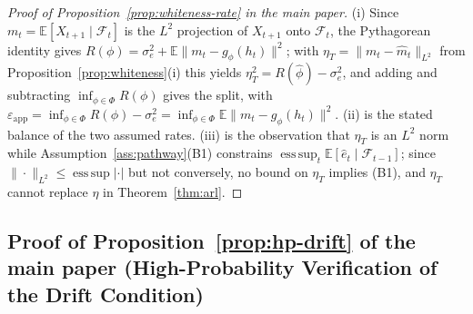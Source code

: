 \documentclass[bj,authoryear]{imsart}
\theoremstyle{plain}
\theoremstyle{definition}
\newcommand{\E}{\mathbb{E}}
\newcommand{\F}{\mathcal{F}}
\begin{document}
\begin{proof}[Proof of Proposition~\ref{prop:whiteness-rate} in the main paper]
  (i) Since $m_t=\E[X_{t+1}\mid\F_t]$ is the $L^2$ projection of $X_{t+1}$
  onto $\F_t$, the Pythagorean identity gives
  $R(\phi)=\sigma_e^2+\E\|m_t-g_\phi(h_t)\|^2$; with
  $\eta_T=\|m_t-\hat m_t\|_{L^2}$ from Proposition~\ref{prop:whiteness}(i) this
  yields $\eta_T^2=R(\hat\phi)-\sigma_e^2$, and adding and subtracting
  $\inf_{\phi\in\Phi}R(\phi)$ gives the split, with
  $\varepsilon_{\mathrm{app}}=\inf_{\phi\in\Phi}R(\phi)-\sigma_e^2
   =\inf_{\phi\in\Phi}\E\|m_t-g_\phi(h_t)\|^2$.
  (ii) is the stated balance of the two assumed rates.  (iii) is the
  observation that $\eta_T$ is an $L^2$ norm while
  Assumption~\ref{ass:pathway}(B1) constrains
  $\operatorname*{ess\,sup}_t\E[\hat e_t\mid\F_{t-1}]$; since
  $\|\cdot\|_{L^2}\leq\operatorname*{ess\,sup}|\cdot|$ but not conversely, no
  bound on $\eta_T$ implies (B1), and $\eta_T$ cannot replace $\eta$ in
  Theorem~\ref{thm:arl}.
\end{proof}

\subsection{Proof of Proposition~\ref{prop:hp-drift} of the main paper (High-Probability Verification of the Drift Condition)}
\label{app:proof-hp-drift}
\end{document}
